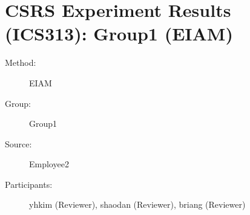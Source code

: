 
%          
\chapter {CSRS Experiment Results (ICS313): Group1 (EIAM)}
\small
	  

\begin{description}
\item [Method:] EIAM
\item [Group:] Group1
\item [Source:] Employee2
\item [Participants:] yhkim (Reviewer), shaodan (Reviewer), briang (Reviewer)
\end{description}
